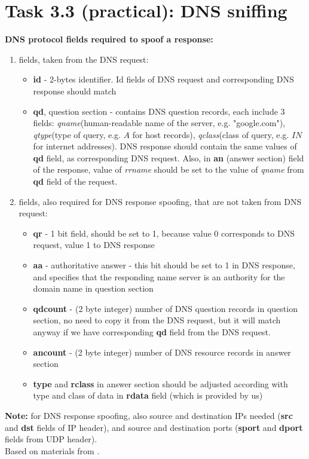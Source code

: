 \documentclass{article}
\begin{document}
\section*{Task 3.3 (practical): DNS sniffing}
\textbf{DNS protocol fields required to spoof a response:}
\begin{enumerate}
\item fields, taken from the DNS request:
\begin{itemize}
\item \textbf{id} - 2-bytes identifier. Id fields of DNS request and corresponding DNS response should match
\item \textbf{qd}, question section - contains DNS question records, each include 3 fields: \textit{qname}(human-readable name of the server, e.g. "google.com"), \textit{qtype}(type of query, e.g. $A$ for host records), \textit{qclass}(class of query, e.g. $IN$ for internet addresses). DNS response should contain the same values of \textbf{qd} field, as corresponding DNS request. Also, in \textbf{an} (answer section) field of the response, value of \textit{rrname} should be set to the value of \textit{qname} from \textbf{qd} field of the request.
\end{itemize}
\item fields, also required for DNS response spoofing, that are not taken from DNS request:
\begin{itemize}
\item \textbf{qr} - 1 bit field, should be set to 1, because value 0 corresponds to DNS request, value 1 to DNS response
\item \textbf{aa} - authoritative answer - this bit should be set to 1 in DNS response, and specifies that the responding name server is an authority for the domain name in question section
\item \textbf{qdcount} - (2 byte integer) number of DNS question records in question section, no need to copy it from the DNS request, but it will match anyway if we have corresponding  \textbf{qd} field from the DNS request.
\item \textbf{ancount} - (2 byte integer) number of DNS resource records in answer section
\item \textbf{type} and \textbf{rclass} in answer section should be adjusted according with type and class of data in \textbf{rdata} field (which is provided by us)
\end{itemize}
\end{enumerate}
\textbf{Note:} for DNS response spoofing, also source and destination IPs needed (\textbf{src} and \textbf{dst} fields of IP header), and source and destination ports (\textbf{sport} and \textbf{dport} fields from UDP header).\\
Based on materials from \cite{dnsframe}.
\end{document}
